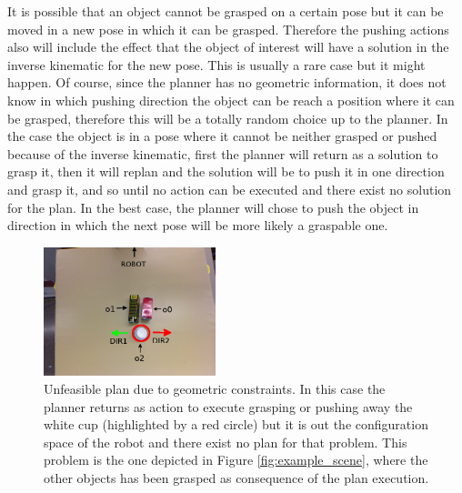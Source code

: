 It is possible that an object cannot be grasped on a certain pose but it can be moved in a new pose in which it can be grasped. Therefore the pushing actions also will include the effect that the object of interest will have a solution in the inverse kinematic for the new pose. This is usually a rare case but it might happen. Of course, since the planner has no geometric information, it does not know in which pushing direction the object can be reach a position where it can be grasped, therefore this will be a totally random choice up to the planner. In the case the object is in a pose where it cannot be neither grasped or pushed because of the inverse kinematic, first the planner will return as a solution to grasp it, then it will replan and the solution will be to push it in one direction and grasp it, and so until no action can be executed and there exist no solution for the plan. In the best case, the planner will chose to push the object in direction in which the next pose will be more likely a graspable one. 


\begin{figure}[h]
\centering
\includegraphics[width=5cm]{Img/backtracking/image4.png}
\caption{Unfeasible plan due to geometric constraints. In this case the planner returns as action to execute grasping or pushing away the white cup (highlighted by a red circle) but it is out the configuration space of the robot and there exist no plan for that problem. This problem is the one depicted in Figure \ref{fig:example_scene}, where the other objects has been grasped as consequence of the plan execution.} \label{fig:backtracking1}
\end{figure}

